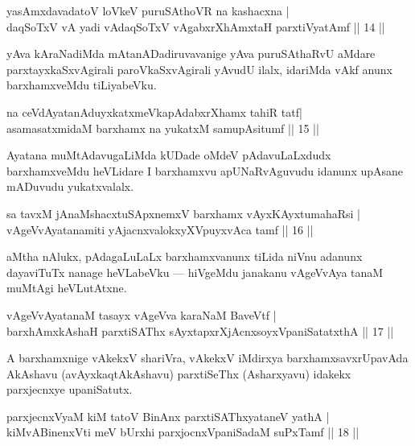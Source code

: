 \begin{shl}
yasAmxdavadatoV loVkeV puruSAthoVR na kashacxna |\\
daqSoTxV vA yadi vA\s daqSoTxV vAgabxrXhAmxtaH parxtiVyatAmf \hfill || 14 || 
\end{shl}

\begin{artha}
yAva kAraNadiMda mAtanADadiruvavanige yAva puruSAthaRvU aMdare parxtayxkaSxvAgirali paroVkaSxvAgirali yAvudU ilalx, idariMda vAkf anunx barxhamxveMdu tiLiyabeVku.
\end{artha}

\begin{shl}
na ceVdAyatanAduyxkatxmeVkapAdabxrXhamx tahiR tatf|\\
asamasatxmidaM barxhamx na yukatxM samupAsitumf \hfill || 15 ||
\end{shl}

\begin{artha}
Ayatana muMtAdavugaLiMda kUDade oMdeV pAdavuLaLxdudx barxhamxveMdu heVLidare I barxhamxvu apUNaRvAguvudu idanunx upAsane mADuvudu yukatxvalalx.
\end{artha}

\begin{shl}
sa tavxM jAnaMshacxtuSApxnemxV barxhamx vAyxKAyxtumahaRsi |\\
vAgeVvA\s \s yatanamiti yAjacnxvalokxyXV\s puyxvAca tamf \hfill || 16 || 
\end{shl}

\begin{artha}
aMtha nAlukx, pAdagaLuLaLx barxhamxvanunx tiLida niVnu adanunx dayaviTuTx nanage heVLabeVku --- hiVgeMdu janakanu vAgeVvAya tanaM muMtAgi heVLutAtxne.
\end{artha}

\begin{shl}
vAgeVvA\s \s yatanaM tasayx vAgeVva karaNaM BaveVtf |\\
barxhAmx\s \s kAshaH parxtiSAThx sAyxtapxrXjAcnx\s soyxVpaniSatatxthA \hfill || 17 || 
\end{shl}

\begin{artha}
A barxhamxnige vAkekxV shariVra, vAkekxV iMdirxya barxhamxsavxrUpavAda AkAshavu (avAyxkaqtAkAshavu) parxtiSeThx (Asharxyavu) idakekx parxjecnxye upaniSatutx.
\end{artha}


\begin{shl}
parxjecnxVyaM kiM tatoV BinAnx parxtiSAThxyataneV yathA |\\
kiMvA\s BinenxVti meV bUrxhi parxjocnxVpaniSadaM suPxTamf \hfill || 18 || 
\end{shl}

